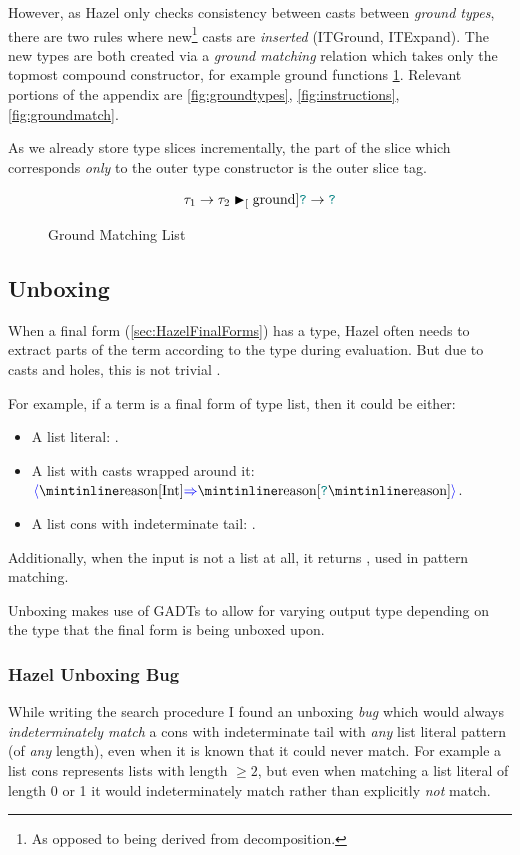 However, as Hazel only checks consistency between casts between \textit{ground types}, there are two rules where new\footnote{As opposed to being derived from decomposition.} casts are \textit{inserted} (ITGround, ITExpand). The new types are both created via a \textit{ground matching} relation which takes only the topmost compound constructor, for example ground functions \cref{fig:GroundFunction}. Relevant portions of the appendix are \cref{fig:groundtypes}, \cref{fig:instructions}, \cref{fig:groundmatch}.

As we already store type slices incrementally, the part of the slice which corresponds \textit{only} to the outer type constructor is the outer slice tag.

\begin{figure}
\[\tau_1 \to \tau_2 \blacktriangleright_{[}\text{ground}] {\color{teal}\texttt{?}} \to {\color{teal}\texttt{?}}\]
\caption{Ground Matching List}
\label{fig:GroundFunction}
\end{figure}

\subsection{Unboxing}
When a final form (\cref{sec:HazelFinalForms}) has a type, Hazel often needs to extract parts of the term according to the type during evaluation. But due to casts and holes, this is not trivial \cite{LivePatternMatching}.

For example, if a term is a final form of type list, then it could be either:
\begin{itemize}
\item A list literal: \code{[1,2,3]}.
\item A list with casts wrapped around it: \code{[1,2,3]}$\scast{\code{[Int]}}{\code{[}\dyn\code{]}}$.
\item A list cons with indeterminate tail: .
\end{itemize}
Additionally, when the input is not a list at all, it returns , used in pattern matching. 

Unboxing makes use of GADTs to allow for varying output type depending on the type that the final form is being unboxed upon.

\subsubsection{Hazel Unboxing Bug}
While writing the search procedure I found an unboxing \textit{bug} which would always \textit{indeterminately match} a cons with indeterminate tail with \textit{any} list literal pattern (of \textit{any} length), even when it is known that it could never match. For example a list cons  represents lists with length $\geq 2$, but even when matching a list literal of length 0 or 1 it would indeterminately match rather than explicitly \textit{not} match. 

